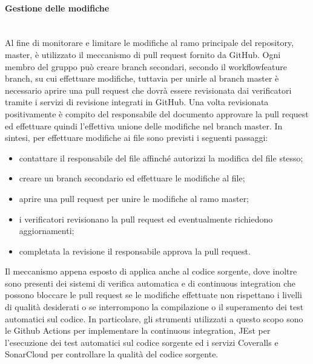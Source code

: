 	\paragraph{Gestione delle modifiche}\mbox{}\\ [1mm]
		Al fine di monitorare e limitare le modifiche al ramo principale del repository\glo, master, è utilizzato il meccanismo di pull request fornito da GitHub. Ogni membro del gruppo può creare branch secondari, secondo il workflow\glosp feature branch, su cui effettuare modifiche, tuttavia per unirle al branch master è necessario aprire una pull request che dovrà essere revisionata dai verificatori tramite i servizi di revisione integrati in GitHub. Una volta revisionata positivamente è compito del responsabile del documento approvare la pull request ed effettuare quindi l'effettiva unione delle modifiche nel branch master.
		\newline
		In sintesi, per effettuare modifiche ai file sono previsti i seguenti passaggi:
		\begin{itemize}
			\item contattare il responsabile del file affinché autorizzi la modifica del file stesso;
			\item creare un branch secondario ed effettuare le modifiche al file;
			\item aprire una pull request per unire le modifiche al ramo master;
			\item i verificatori revisionano la pull request ed eventualmente richiedono aggiornamenti;
			\item completata la revisione il responsabile approva la pull request.
		\end{itemize}
	
		Il meccanismo appena esposto di applica anche al codice sorgente, dove inoltre sono presenti dei sistemi di verifica automatica e di continuous integration che possono bloccare le pull request se le modifiche effettuate non rispettano i livelli di qualità desiderati o se interrompono la compilazione o il superamento dei test automatici sul codice. In particolare, gli strumenti utilizzati a questo scopo sono le Github Actions per implementare la continuous integration, JEst per l'esecuzione dei test automatici sul codice sorgente ed i servizi Coveralls e SonarCloud per controllare la qualità del codice sorgente.
		
